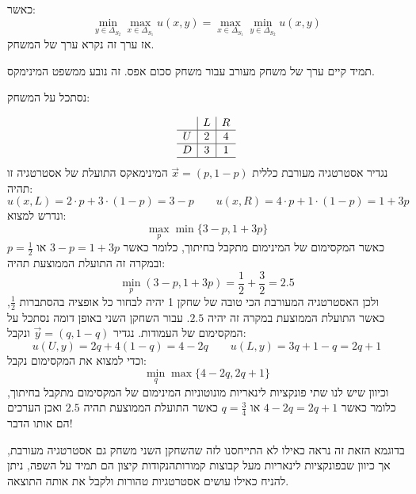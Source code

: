 \documentclass{tstextbook}
\begin{document}
\begin{definition}
כאשר:
$$\min_{y \in \Delta_{S_{2}}} \max _{x \in \Delta_{S_{1}}}u(x,y)=\max_{x \in \Delta_{S_{1}}}\min _{y \in \Delta_{S_{2}}} u(x,y)$$
אז ערך זה נקרא ערך של המשחק.

\end{definition}
\begin{remark}
תמיד קיים ערך של משחק מעורב עבור משחק סכום אפס. זה נובע ממשפט המינימקס. 

\end{remark}
\begin{example}
נסתכל על המשחק:

$$\begin{array}{c|c|c}  & L & R\\ \hline  U & 2 & 4\\ \hline D & 3 & 1\\ \hline
\end{array}$$
נגדיר אסטרטגיה מעורבת כללית \(\vec{x}=(p,1-p)\) המינימאקס התועלת של אסטרטגיה זו תהיה:
$$u(x,L)=2\cdot p+3\cdot(1-p)=3-p\qquad u(x,R)=4\cdot p +1\cdot(1-p)=1+3p$$
ונדרש למצוא:
$$\max _{p}\min \{ 3-p,1+3p \}$$
כאשר המקסימום של המינימום מתקבל בחיתוך, כלומר כאשר \(3-p=1+3p\) או \(p=\frac{1}{2}\) ובמקרה זה התועלת הממוצעת תהיה:
$$\min_{p} (3-p,1+3p)=\frac{1}{2}+\frac{3}{2}=2.5$$
ולכן האסטרטגיה המעורבת הכי טובה של שחקן 1 יהיה לבחור כל אופציה בהסתברות \(\frac{1}{2}\), כאשר התועלת הממוצעת במקרה זה יהיה \(2.5\).
עבור השחקן השני באופן דומה נסתכל על המקסימום של העמודות. נגדיר \(\vec{y}=(q,1-q)\) ונקבל:
$$u(U,y)=2q+4(1-q)=4-2q\qquad u(L,y)=3q+1-q=2q+1$$
וכדי למצוא את המקסימום נקבל:
$$\operatorname*{min}_{q}\operatorname*{max}\{4-2q,2q+1\}$$
וכיוון שיש לנו שתי פונקציות לינאריות מונוטוניות המינימום של המקסימום מתקבל בחיתוך, כלומר כאשר \(4-2q=2q+1\) או \(q=\frac{3}{4}\) כאשר התועלת הממוצעת תהיה \(2.5\) ואכן הערכים הם אותו הדבר!

\end{example}
\begin{remark}
בדוגמא הזאת זה נראה כאילו לא התייחסנו לזה שהשחקן השני משחק גם אסטרטגיה מעורבת, אך כיוון שבפונקציות לינאריות מעל קבוצות קמורותהנקודות קיצון הם תמיד על השפה, ניתן להניח כאילו עושים אסטרטגיות טהורות ולקבל את אותה התוצאה.

\end{remark}
\end{document}
